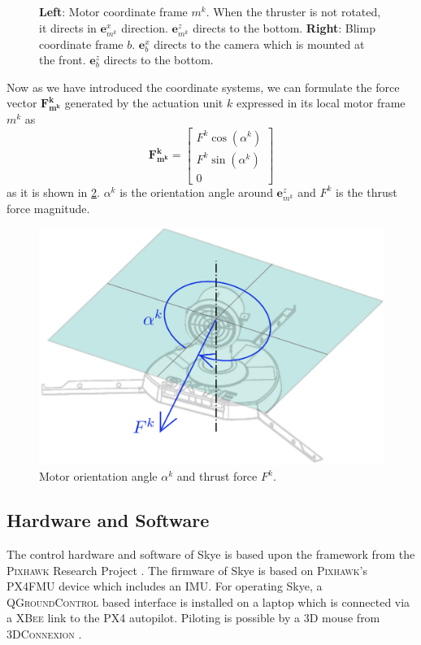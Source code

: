 \begin{figure}[hbtp]
\caption{\textbf{Left}: Motor coordinate frame $m^k$. When the thruster is not rotated, it directs in $\mathbf{e}^x_{m^k}$ direction. $\mathbf{e}^z_{m^k}$ directs to the bottom.
\textbf{Right}: Blimp coordinate frame $b$. $\mathbf{e}^x_{b}$ directs to the camera which is mounted at the front. 
$\mathbf{e}^z_{b}$ directs to the bottom.}
\label{fig:frames}
\end{figure}

Now as we have introduced the coordinate systems, we can formulate the force vector $\mathbf{F_{m^k}^k}$ generated by the actuation unit $k$ expressed in its local motor frame $m^k$ as
\begin{equation}
\mathbf{F_{m^k}^k} = 
\left[\begin{array}{c}
F^k \cos(\alpha^k) \\
F^k \sin(\alpha^k) \\
0
\end{array}\right]
\end{equation}
as it is shown in \cref{fig:motor_force}.
$\alpha^k$ is the orientation angle around $\mathbf{e}_{m^k}^z$ and $F^k$ is the thrust force magnitude.

\begin{figure}[hbtp]
\captionsetup{width=0.9\textwidth}
\centering
\includegraphics[width=.4\linewidth]{images/intro/motor_force.eps}
\caption{Motor orientation angle $\alpha^k$ and thrust force $F^k$.}
\label{fig:motor_force}
\end{figure}

\subsection{Hardware and Software}
The control hardware and software of Skye is based upon the framework from the \textsc{Pixhawk} Research Project \citep{pixhawk}.
The firmware of Skye is based on \textsc{Pixhawk}'s PX4FMU device which includes an IMU.
For operating Skye, a \textsc{QGroundControl} based interface is installed on a laptop
which is connected via a \textsc{XBee} link to the PX4 autopilot.
Piloting is possible by a 3D mouse from \textsc{3DConnexion} \citep[see][]{Krebs2012}.

